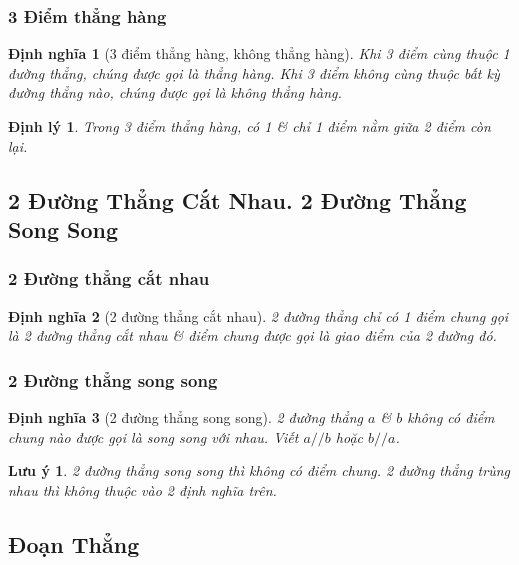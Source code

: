 \documentclass{article}
\numberwithin{equation}{section}
\newtheorem{definition}{Định nghĩa}[section]
\newtheorem{theorem}{Định lý}[section]
\newtheorem{remark}{Lưu ý}[section]
\begin{document}
\subsubsection{3 Điểm thẳng hàng}

\begin{definition}[3 điểm thẳng hàng, không thẳng hàng]
	Khi 3 điểm cùng thuộc 1 đường thẳng, chúng được gọi là \emph{thẳng hàng}. Khi 3 điểm không cùng thuộc bất kỳ đường thẳng nào, chúng được gọi là \emph{không thẳng hàng}.
\end{definition}

\begin{theorem}
	Trong 3 điểm thẳng hàng, có 1 \textit{\&} chỉ 1 điểm nằm giữa 2 điểm còn lại.
\end{theorem}

\subsection{2 Đường Thẳng Cắt Nhau. 2 Đường Thẳng Song Song}

\subsubsection{2 Đường thẳng cắt nhau}

\begin{definition}[2 đường thẳng cắt nhau]
	2 đường thẳng chỉ có 1 điểm chung gọi là \emph{2 đường thẳng cắt nhau} \textit{\&} điểm chung được gọi là \emph{giao điểm} của 2 đường đó.
\end{definition}

\subsubsection{2 Đường thẳng song song}

\begin{definition}[2 đường thẳng song song]
	2 đường thẳng $a$ \textit{\&} $b$ không có điểm chung nào được gọi là \emph{song song với nhau}. Viết $a//b$ hoặc $b//a$.
\end{definition}

\begin{remark}
	2 đường thẳng song song thì không có điểm chung. 2 đường thẳng \emph{trùng nhau} thì không thuộc vào 2 định nghĩa trên.
\end{remark}

\subsection{Đoạn Thẳng}
\end{document}
